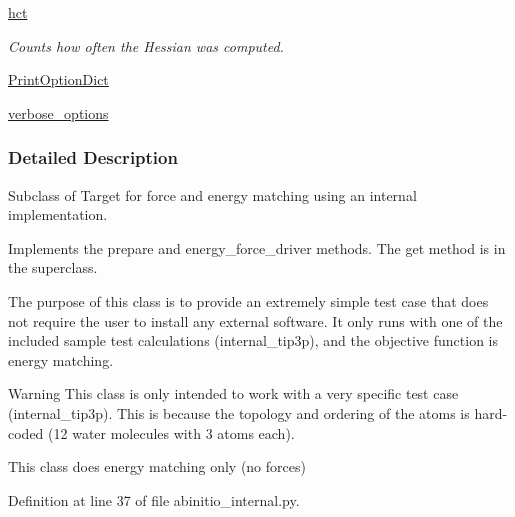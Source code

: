 \begin{DoxyCompactItemize}
\hyperlink{classforcebalance_1_1target_1_1Target_ae929918b7e695a99d7ec946d06d793e1}{hct}
\begin{DoxyCompactList}\small\item\em \-Counts how often the \-Hessian was computed. \end{DoxyCompactList}\item 
\hyperlink{classforcebalance_1_1BaseClass_afc6659278497d7245bc492ecf405ccae}{\-Print\-Option\-Dict}
\item 
\hyperlink{classforcebalance_1_1BaseClass_afd68efa29ccd2f320f4cf82198214aac}{verbose\-\_\-options}
\end{DoxyCompactItemize}


\subsubsection{\-Detailed \-Description}
\-Subclass of \-Target for force and energy matching using an internal implementation. 

\-Implements the prepare and energy\-\_\-force\-\_\-driver methods. \-The get method is in the superclass.

\-The purpose of this class is to provide an extremely simple test case that does not require the user to install any external software. \-It only runs with one of the included sample test calculations (internal\-\_\-tip3p), and the objective function is energy matching.

\begin{DoxyWarning}{\-Warning}
\-This class is only intended to work with a very specific test case (internal\-\_\-tip3p). \-This is because the topology and ordering of the atoms is hard-\/coded (12 water molecules with 3 atoms each).

\-This class does energy matching only (no forces) 
\end{DoxyWarning}


\-Definition at line 37 of file abinitio\-\_\-internal.\-py.



